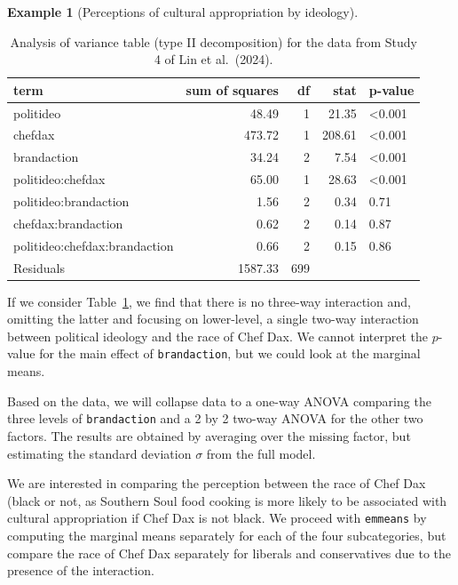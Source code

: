 \documentclass[
  11pt,
  letterpaper,
]{scrbook}
\theoremstyle{plain}
\theoremstyle{definition}
\newtheorem{example}{Example}[chapter]
\theoremstyle{definition}
\theoremstyle{plain}
\theoremstyle{remark}
\begin{document}
\begin{example}[Perceptions of cultural appropriation by
ideology]
\begin{longtable}[]{@{}lrrrl@{}}
\caption{\label{tbl-anova-LKUK24}Analysis of variance table (type II
decomposition) for the data from Study 4 of Lin et al.~(2024).}

\tabularnewline

\toprule\noalign{}
term & sum of squares & df & stat & p-value \\
\midrule\noalign{}
\endhead
\bottomrule\noalign{}
\endlastfoot
politideo & 48.49 & 1 & 21.35 & \textless0.001 \\
chefdax & 473.72 & 1 & 208.61 & \textless0.001 \\
brandaction & 34.24 & 2 & 7.54 & \textless0.001 \\
politideo:chefdax & 65.00 & 1 & 28.63 & \textless0.001 \\
politideo:brandaction & 1.56 & 2 & 0.34 & 0.71 \\
chefdax:brandaction & 0.62 & 2 & 0.14 & 0.87 \\
politideo:chefdax:brandaction & 0.66 & 2 & 0.15 & 0.86 \\
Residuals & 1587.33 & 699 & & \\

\end{longtable}

If we consider Table~\ref{tbl-anova-LKUK24}, we find that there is no
three-way interaction and, omitting the latter and focusing on
lower-level, a single two-way interaction between political ideology and
the race of Chef Dax. We cannot interpret the \(p\)-value for the main
effect of \texttt{brandaction}, but we could look at the marginal means.

Based on the data, we will collapse data to a one-way ANOVA comparing
the three levels of \texttt{brandaction} and a 2 by 2 two-way ANOVA for
the other two factors. The results are obtained by averaging over the
missing factor, but estimating the standard deviation \(\sigma\) from
the full model.

We are interested in comparing the perception between the race of Chef
Dax (black or not, as Southern Soul food cooking is more likely to be
associated with cultural appropriation if Chef Dax is not black. We
proceed with \texttt{emmeans} by computing the marginal means separately
for each of the four subcategories, but compare the race of Chef Dax
separately for liberals and conservatives due to the presence of the
interaction.


\end{example}
\end{document}
